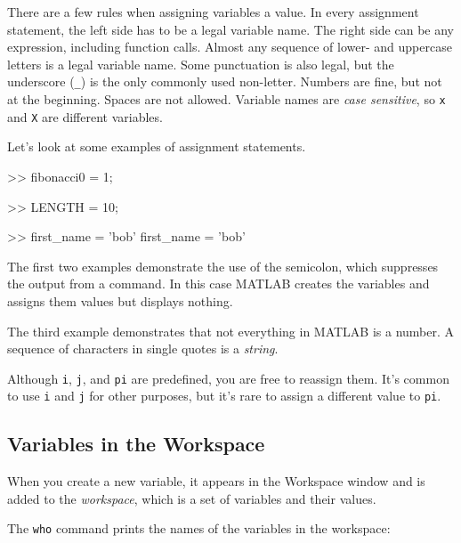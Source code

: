 
There are a few rules when assigning variables a value. In every assignment statement, the left side has to be a legal variable name.  The right side can be any expression, including function calls.
%
%
%
%
Almost any sequence of lower- and uppercase letters is a legal
variable name.
Some punctuation is also legal, but the underscore (\lstinline{_}) is the only commonly used non-letter.
Numbers are fine, but not at the beginning.
Spaces are not allowed.  Variable names are
\emph{case sensitive}, so \lstinline{x} and \lstinline{X} are different variables.

Let's look at some examples of assignment statements.

\begin{code}
>> fibonacci0 = 1;

>> LENGTH = 10;

>> first_name = 'bob'
first_name = 'bob'
\end{code}

The first two examples demonstrate the use of the semicolon, which
suppresses the output from a command.  In this case MATLAB creates the
variables and assigns them values but displays nothing.
%
%
%
%

The third example demonstrates that not everything
in MATLAB is a number.
A sequence of characters in single quotes is
a \emph{string}.


Although \lstinline{i}, \lstinline{j}, and \lstinline{pi} are predefined, you are free
to reassign them.  It's common to use \lstinline{i} and \lstinline{j} for other
purposes, but it's rare to assign a different value to
\lstinline{pi}.



\subsection{Variables in the Workspace}

When you create a new variable, it appears in the Workspace window and is added to the \emph{workspace}, which is a
set of variables and their values.


The \lstinline{who} command prints the
names of the variables in the workspace:

